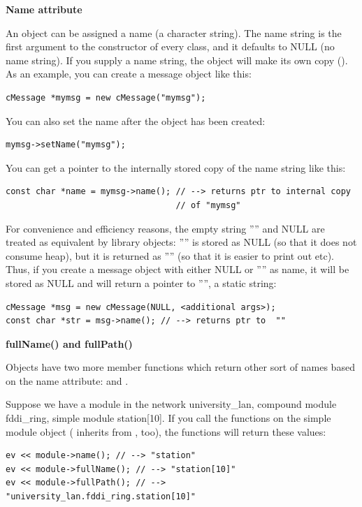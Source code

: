 \textbf{Name attribute}


An object can be assigned a name (a character string). The name 
string is the first argument to the constructor of every class, 
and it defaults to NULL (no name string). If you supply a name 
string, the object will make its own copy (). As an example, 
you can create a message object like this:

\begin{Verbatim}
cMessage *mymsg = new cMessage("mymsg");
\end{Verbatim}


You can also set the name after the object has been created:

\begin{Verbatim}
mymsg->setName("mymsg");
\end{Verbatim}

You can get a pointer to the internally stored copy of the name 
string like this:

\begin{Verbatim}
const char *name = mymsg->name(); // --> returns ptr to internal copy
                                  // of "mymsg"
\end{Verbatim}


For convenience and efficiency reasons, the empty string '''' 
and NULL are treated as equivalent by library objects: '''' 
is stored as NULL (so that it does not consume heap), but it 
is returned as '''' (so that it is easier to print 
out etc). Thus, if you create a message object with either NULL 
or '''' as name, it will be stored as NULL and  
will return a pointer to '''', a static string:

\begin{Verbatim}
cMessage *msg = new cMessage(NULL, <additional args>);
const char *str = msg->name(); // --> returns ptr to  ""
\end{Verbatim}


\textbf{fullName() and fullPath()}


Objects have two more member functions which return other sort 
of names based on the name attribute:  and .

Suppose we have a module in the network university\_lan, compound
module fddi\_ring, simple module station[10]. If you call the functions
on the simple module object ( inherits from
, too), the functions will return these values:

\begin{Verbatim}
ev << module->name(); // --> "station"
ev << module->fullName(); // --> "station[10]"
ev << module->fullPath(); // --> "university_lan.fddi_ring.station[10]"
\end{Verbatim}



